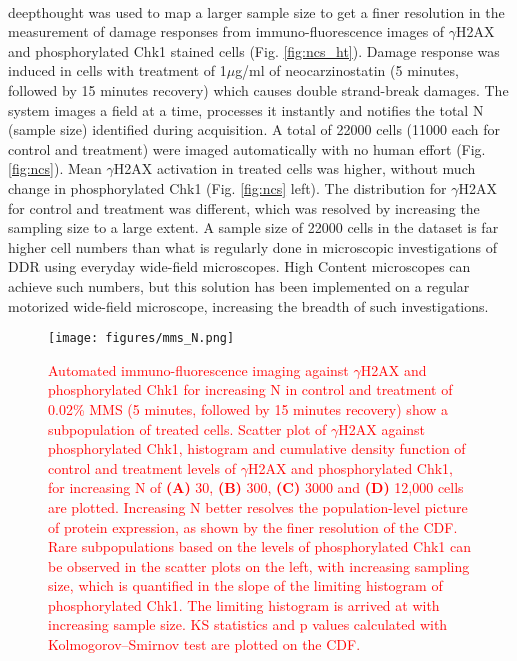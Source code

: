 \paragraph*{} deepthought was used to map a larger sample size to get a finer resolution in the measurement of damage responses from immuno-fluorescence images of $\gamma$H2AX and phosphorylated Chk1 stained cells (Fig. \ref{fig:ncs_ht}). Damage response was induced in cells with treatment of 1$\mu$g/ml of neocarzinostatin (5 minutes, followed by 15 minutes recovery) which causes double strand-break damages. The system images a field at a time, processes it instantly and notifies the total N (sample size) identified during acquisition. A total of 22000 cells (11000 each for control and treatment) were imaged automatically with no human effort (Fig. \ref{fig:ncs}). Mean $\gamma$H2AX activation in treated cells was higher, without much change in phosphorylated Chk1 (Fig. \ref{fig:ncs} left). The distribution for $\gamma$H2AX for control and treatment was different, which was resolved by increasing the sampling size to a large extent. A sample size of 22000 cells in the dataset is far higher cell numbers than what is regularly done in microscopic investigations of DDR using everyday wide-field microscopes. High Content microscopes can achieve such numbers, but this solution has been implemented on a regular motorized wide-field microscope, increasing the breadth of such investigations.


\begin{figure}[h]
    {\hfill\texttt{[image: figures/mms\_N.png]}\hspace*{\fill}}
    \caption{\textcolor{red}{Automated immuno-fluorescence imaging against $\gamma$H2AX and phosphorylated Chk1 for increasing N in control and treatment of 0.02\% MMS (5 minutes, followed by 15 minutes recovery) show a subpopulation of treated cells. Scatter plot of $\gamma$H2AX against phosphorylated Chk1, histogram and cumulative density function of control and treatment levels of $\gamma$H2AX and phosphorylated Chk1, for increasing N of \textbf{(A)} 30, \textbf{(B)} 300, \textbf{(C)} 3000 and \textbf{(D)} 12,000 cells are plotted. Increasing N better resolves the population-level picture of protein expression, as shown by the finer resolution of the CDF. Rare subpopulations based on the levels of phosphorylated Chk1 can be observed in the scatter plots on the left, with increasing sampling size, which is quantified in the slope of the limiting histogram of phosphorylated Chk1. The limiting histogram is arrived at with increasing sample size. KS statistics and p values calculated with Kolmogorov–Smirnov test are plotted on the CDF.}}
    {\label{fig:mms_N}}
\end{figure}



